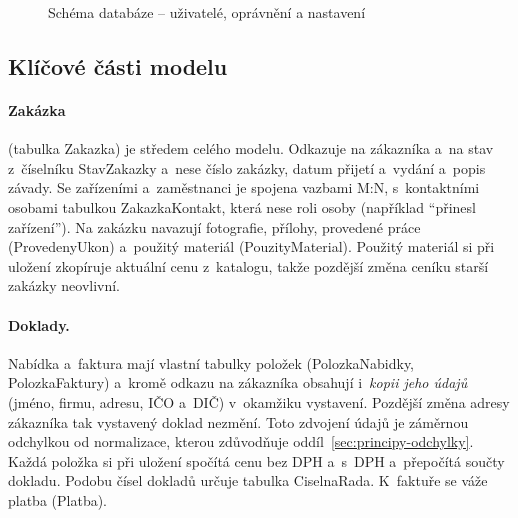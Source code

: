 \begin{figure}[htbp]
\centering
{}
\caption{Schéma databáze -- uživatelé, oprávnění a nastavení}\label{fig:db-ostatni}
\end{figure}
\subsection{Klíčové části modelu}\label{sec:tabulky}

\paragraph{Zakázka} (tabulka Zakazka) je středem celého modelu. Odkazuje na zákazníka a~na stav z~číselníku StavZakazky a~nese číslo zakázky, datum přijetí a~vydání a~popis závady. Se zařízeními a~zaměstnanci je spojena vazbami M:N, s~kontaktními osobami tabulkou ZakazkaKontakt, která nese roli osoby (například \enquote{přinesl zařízení}). Na zakázku navazují fotografie, přílohy, provedené práce (ProvedenyUkon) a~použitý materiál (PouzityMaterial). Použitý materiál si při uložení zkopíruje aktuální cenu z~katalogu, takže pozdější změna ceníku starší zakázky neovlivní.

\paragraph{Doklady.} Nabídka a~faktura mají vlastní tabulky položek (PolozkaNabidky, PolozkaFaktury) a~kromě odkazu na zákazníka obsahují i~\emph{kopii jeho údajů} (jméno, firmu, adresu, IČO a~DIČ) v~okamžiku vystavení. Pozdější změna adresy zákazníka tak vystavený doklad nezmění. Toto zdvojení údajů je záměrnou odchylkou od normalizace, kterou zdůvodňuje oddíl~\ref{sec:principy-odchylky}. Každá položka si při uložení spočítá cenu bez DPH a~s~DPH a~přepočítá součty dokladu. Podobu čísel dokladů určuje tabulka CiselnaRada. K~faktuře se váže platba (Platba).

